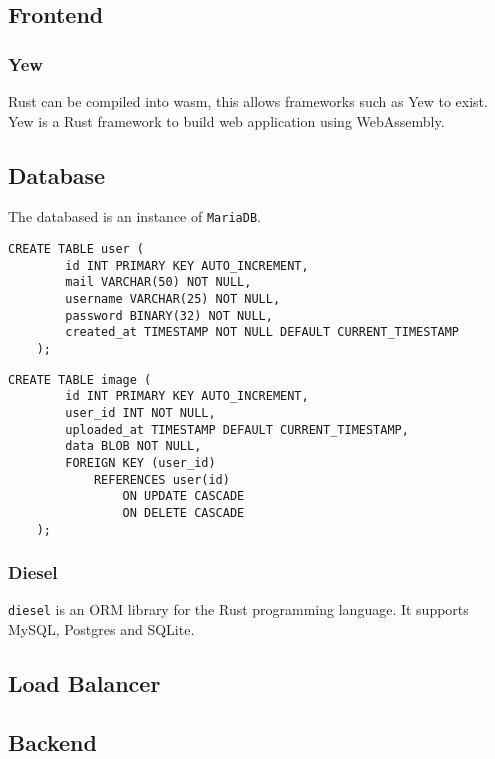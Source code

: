 \documentclass[../documentation.tex]{subfiles}
\begin{document}
\subsection{Frontend}

\subsubsection{Yew}

Rust can be compiled into wasm, this allows frameworks such as Yew to exist.
Yew is a Rust framework to build web application using WebAssembly.

\subsection{Database}

The databased is an instance of \texttt{MariaDB}.

\begin{lstlisting}[style=sql]
    CREATE TABLE user (
        id INT PRIMARY KEY AUTO_INCREMENT,
        mail VARCHAR(50) NOT NULL,
        username VARCHAR(25) NOT NULL,
        password BINARY(32) NOT NULL,
        created_at TIMESTAMP NOT NULL DEFAULT CURRENT_TIMESTAMP
    );
\end{lstlisting}

\begin{lstlisting}[style=sql]
    CREATE TABLE image (
        id INT PRIMARY KEY AUTO_INCREMENT,
        user_id INT NOT NULL,
        uploaded_at TIMESTAMP DEFAULT CURRENT_TIMESTAMP,
        data BLOB NOT NULL,
        FOREIGN KEY (user_id)
            REFERENCES user(id)
                ON UPDATE CASCADE
                ON DELETE CASCADE
    );
\end{lstlisting}

\subsubsection{Diesel}

\texttt{diesel} is an ORM library for the Rust programming language.
It supports MySQL, Postgres and SQLite.

\subsection{Load Balancer}

\subsection{Backend}
\end{document}
